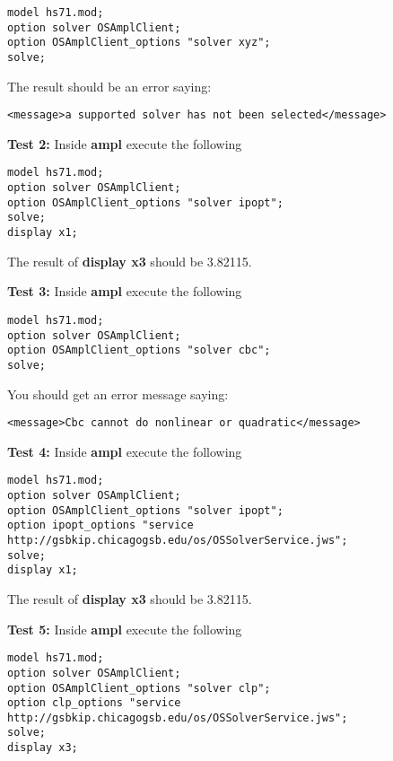 \begin{itemize}
\begin{itemize}
\begin{verbatim}
model hs71.mod;
option solver OSAmplClient;
option OSAmplClient_options "solver xyz";
solve;
\end{verbatim}

The result should be an error saying:
\begin{verbatim}
<message>a supported solver has not been selected</message>
\end{verbatim}
 
 \vskip 10pt
 
 {\bf Test 2:}  Inside  {\bf ampl} execute the following
 


\begin{verbatim}
model hs71.mod;
option solver OSAmplClient;
option OSAmplClient_options "solver ipopt";
solve;
display x1;
\end{verbatim}

The result of {\bf display x3} should be 3.82115. 


 \vskip 10pt
 
 {\bf Test 3:}  Inside  {\bf ampl} execute the following
 


\begin{verbatim}
model hs71.mod;
option solver OSAmplClient;
option OSAmplClient_options "solver cbc";
solve;
\end{verbatim}

You should get an error message saying:
\begin{verbatim}
<message>Cbc cannot do nonlinear or quadratic</message>
\end{verbatim}


\vskip 10pt

{\small
{\bf Test 4:}  Inside  {\bf ampl} execute the following
\begin{verbatim}
model hs71.mod;
option solver OSAmplClient;
option OSAmplClient_options "solver ipopt";
option ipopt_options "service http://gsbkip.chicagogsb.edu/os/OSSolverService.jws";
solve;
display x1;
\end{verbatim}
}%

The result of {\bf display x3} should be 3.82115. 


\vskip 10pt

{\small
{\bf Test 5:}  Inside  {\bf ampl} execute the following
\begin{verbatim}
model hs71.mod;
option solver OSAmplClient;
option OSAmplClient_options "solver clp";
option clp_options "service http://gsbkip.chicagogsb.edu/os/OSSolverService.jws";
solve;
display x3;
\end{verbatim}
}%


\end{itemize}
\end{itemize}
